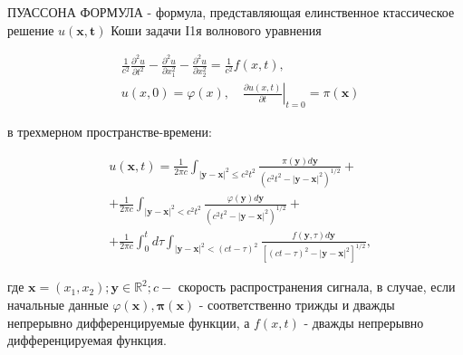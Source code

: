 \documentclass[10pt]{article}
\begin{document}
ПУАССОНА ФОРМУЛА - формула, представляющая елинственное ктассическое решение $u(\boldsymbol{x}, \boldsymbol{t})$ Коши задачи І1я волнового уравнения



\[

\begin{aligned}

& \frac{1}{c^{2}} \frac{\partial^{2} u}{\partial t^{2}}-\frac{\partial^{2} u}{\partial x_{1}^{2}}-\frac{\partial^{2} u}{\partial x_{2}^{2}}=\frac{1}{c^{2}} f(x, t), \\

& u(x, 0)=\varphi(x),\left.\quad \frac{\partial u(x, t)}{\partial t}\right|_{t=0}=\pi(\boldsymbol{x})

\end{aligned}

\]



в трехмерном пространстве-времени:



\[

\begin{aligned}

& u(\boldsymbol{x}, t)=\frac{1}{2 \pi c} \int_{|\boldsymbol{y}-\boldsymbol{x}|^{2} \leqslant c^{2} t^{2}} \frac{\pi(\boldsymbol{y}) d \boldsymbol{y}}{\left(c^{2} t^{2}-|\boldsymbol{y}-\boldsymbol{x}|^{2}\right)^{1 / 2}}+ \\

& +\frac{1}{2 \pi c} \int_{|\boldsymbol{y}-\boldsymbol{x}|^{2}<c^{2} t^{2}} \frac{\varphi(\boldsymbol{y}) d \boldsymbol{y}}{\left(c^{2} t^{2}-|\boldsymbol{y}-\boldsymbol{x}|^{2}\right)^{1 / 2}}+ \\

& +\frac{1}{2 \pi c} \int_{0}^{t} d \tau \int_{|\boldsymbol{y}-\boldsymbol{x}|^{2}<(c t-\tau)^{2}} \frac{f(\boldsymbol{y}, \tau) d \boldsymbol{y}}{\left[(c t-\tau)^{2}-|\boldsymbol{y}-\boldsymbol{x}|^{2}\right]^{1 / 2}},

\end{aligned}

\]



где $\boldsymbol{x}=\left(x_{1}, x_{2}\right) ; \boldsymbol{y} \in \mathbb{R}^{2} ; c-$ скорость распространения сигнала, в случае, если начальные данные $\varphi(\boldsymbol{x}), \boldsymbol{\pi}(\boldsymbol{x})$ - соответственно трижды и дважды непрерывно дифференцируемые функции, а $f(x, t)$ - дважды непрерывно дифференцируемая функция.
\end{document}
